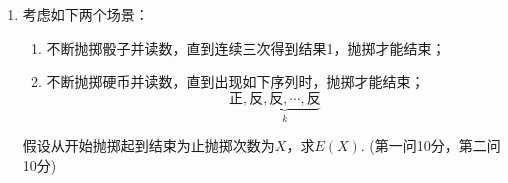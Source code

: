 \documentclass[12pt]{article}
\newcommand{\hei}{\CJKfamily{hei}}                          %
\newcommand*{\dif}{\mathop{}\!\mathrm{d}}
\begin{document}
\begin{enumerate}
\begin{proof}[解]
\begin{equation}
\begin{aligned}
	&\mbox{令}t=x-y \\ 
	&=\lambda^2 \int_{0}^{+\infty}e^{-\lambda y}\int_{-y}^{0}t^2e^{-\lambda t}e^{-\lambda y}\dif t\dif y \\
	&=\lambda^2 \int_{0}^{+\infty}e^{-\lambda y}\left(\frac{1}{\lambda}y^2-\frac{2}{\lambda^2}y-\frac{2}{\lambda^3}e^{-\lambda y}+\frac{2}{\lambda^3}\right) \dif y \\
	&=\int_{0}^{+\infty}y^2(\lambda e^{-\lambda y})\dif y-\frac{2}{\lambda}\int_{0}^{+\infty}y(\lambda e^{-\lambda y})\dif y\\
	&\quad-\frac{2}{\lambda}\int_{0}^{+\infty}(\lambda e^{-2\lambda y})\dif y+\frac{2}{\lambda}\int_{0}^{+\infty}(\lambda e^{-\lambda y})\dif y \\
	&=\frac{2}{\lambda^2}-\frac{2}{\lambda^2}-\frac{1}{\lambda^2}+\frac{2}{\lambda^2} \\
	&=\frac{1}{\lambda^2}
	\end{aligned}
	\end{equation}
	所以：
	\begin{equation}
	E[(X-Y)^2|X<Y]=\frac{2}{\lambda^2}
	\end{equation}
\end{proof}

\newpage
\item {\hei 考虑如下两个场景：\begin{enumerate}
		\item 不断抛掷骰子并读数，直到连续三次得到结果1，抛掷才能结束；
		\item 不断抛掷硬币并读数，直到出现如下序列时，抛掷才能结束；
		\begin{equation*}
		\mbox{正},\underbrace{\mbox{反},\mbox{反},\cdots,\mbox{反}}_k
		\end{equation*}
\end{enumerate}
假设从开始抛掷起到结束为止抛掷次数为$X$，求$E(X)$. (第一问10分，第二问10分)}


\end{enumerate}
\end{document}
